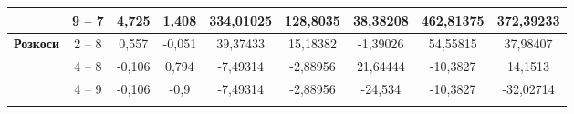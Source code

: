 \documentclass[a4paper,14pt]{article}
\begin{document}
\begin{landscape}
\begin{center}
\begin{table}[]
\begin{tabular}{|c|c|c|c|c|c|c|c|c|}
                                             & 9 – 7                                & 4,725                                                                             & 1,408                                                                            & 334,01025                                                                                                        & 128,8035                                                                           & 38,38208                                                                           & 462,81375                     & 372,39233                     \\ \hline
    \multirow{4}{*}{\textbf{Розкоси}}        & 2 – 8                                & 0,557                                                                             & -0,051                                                                           & 39,37433                                                                                                         & 15,18382                                                                           & -1,39026                                                                           & 54,55815                      & 37,98407                      \\ \cline{2-9} 
                                             & 4 – 8                                & -0,106                                                                            & 0,794                                                                            & -7,49314                                                                                                         & -2,88956                                                                           & 21,64444                                                                           & -10,3827                      & 14,1513                       \\ \cline{2-9} 
                                             & 4 – 9                                & -0,106                                                                            & -0,9                                                                             & -7,49314                                                                                                         & -2,88956                                                                           & -24,534                                                                            & -10,3827                      & -32,02714                     \\ \cline{2-9} 

\end{tabular}
\end{table}
\end{center}
\end{landscape}
\end{document}
